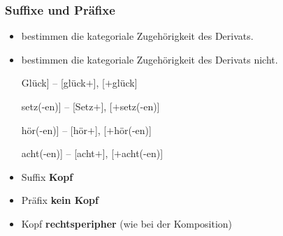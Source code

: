 \begin{frame}
\frametitle{Suffixe und Präfixe}

\begin{itemize}
	\item {} bestimmen die kategoriale Zugehörigkeit des Derivats.
	
	\item {} bestimmen \idR die kategoriale Zugehörigkeit des Derivats nicht.
	
	\ea 
	\ea {[}Glück] -- [glück$+$], [$+$glück]
	
	\ex {[}setz(-en)] -- [Setz$+$], [$+$setz(-en)]
	
	\ex {[}hör(-en)] -- [hör$+$], [$+$hör(-en)]
	
	\ex {[}acht(-en)] -- [acht$+$], [$+$acht(-en)]
	\z
	\z 
	
	\medskip 
	
	\item Suffix \ras \textbf{Kopf}
	
	\item Präfix \ras \textbf{kein Kopf}
	
	\item Kopf  \ras \textbf{rechtsperipher} (wie bei der Komposition)
\end{itemize}
\end{frame}


